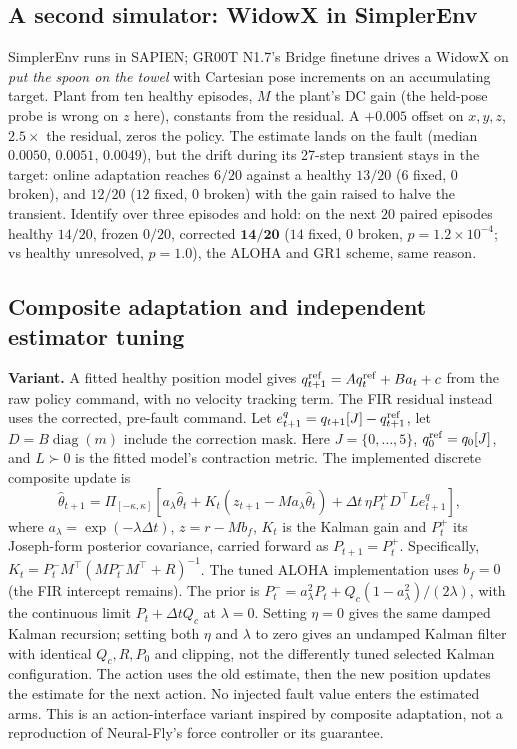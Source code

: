 \documentclass{article}
\begin{document}
\subsection{A second simulator: WidowX in SimplerEnv}
\label{sec:widowx}
SimplerEnv \citep{li2024simpler} runs in SAPIEN; GR00T N1.7's Bridge finetune drives a
WidowX on \emph{put the spoon on the towel} with Cartesian pose increments on an
accumulating target. Plant from ten healthy episodes, $M$ the plant's DC gain (the held-pose
probe is wrong on $z$ here), constants from the residual. A $+0.005$ offset on $x,y,z$,
$2.5\times$ the residual, zeros the policy. The estimate lands on the fault (median $0.0050$,
$0.0051$, $0.0049$), but the drift during its 27-step transient stays in the target:
online adaptation reaches $6/20$ against a healthy $13/20$ ($6$ fixed, $0$ broken), and
$12/20$ ($12$ fixed, $0$ broken) with the gain raised to halve the transient. Identify over
three episodes and hold: on the next $20$ paired episodes healthy $14/20$, frozen $0/20$,
corrected $\mathbf{14/20}$ ($14$ fixed, $0$ broken, $p=1.2\times10^{-4}$; vs healthy
unresolved, $p=1.0$), the ALOHA and GR1 scheme, same reason.

\subsection{Composite adaptation and independent estimator tuning}
\label{sec:composite}

\textbf{Variant.} A fitted healthy position model gives
$q^{\rm ref}_{t+1}=Aq^{\rm ref}_t+B a_t+c$ from the raw policy command, with no velocity
tracking term. The FIR residual instead uses the corrected, pre-fault command. Let
$e^q_{t+1}=q_{t+1}[J]-q^{\rm ref}_{t+1}$, let $D=B\operatorname{diag}(m)$ include the correction
mask. Here $J=\{0,\ldots,5\}$, $q^{\rm ref}_0=q_0[J]$, and $L\succ0$ is the fitted
model's contraction metric. The implemented discrete
composite update is
\begin{equation}\label{eq:composite}
\hat\theta_{t+1}=\Pi_{[-\kappa,\kappa]}\!\left[
 a_\lambda\hat\theta_t+K_t(z_{t+1}-M a_\lambda\hat\theta_t)
 +\Delta t\,\eta P^+_t D^\top L e^q_{t+1}\right],
\end{equation}
where $a_\lambda=\exp(-\lambda\Delta t)$, $z=r-Mb_f$, $K_t$ is the Kalman gain and
$P^+_t$ its Joseph-form posterior covariance, carried forward as $P_{t+1}=P^+_t$. Specifically,
$K_t=P^-_tM^\top(MP^-_tM^\top+R)^{-1}$. The tuned ALOHA implementation uses
$b_f=0$ (the FIR intercept remains). The prior is
$P^-_t=a_\lambda^2P_t+Q_c(1-a_\lambda^2)/(2\lambda)$, with the continuous limit
$P_t+\Delta t Q_c$ at $\lambda=0$. Setting $\eta=0$ gives the same damped Kalman recursion;
setting both $\eta$ and $\lambda$ to zero gives an undamped Kalman filter with identical
$Q_c,R,P_0$ and clipping, not the differently tuned selected Kalman configuration. The action uses the
old estimate, then the new position updates the estimate for the next action. No injected
fault value enters the estimated arms. This is an action-interface variant inspired by
composite adaptation, not a reproduction of Neural-Fly's force controller or its guarantee.
\end{document}
